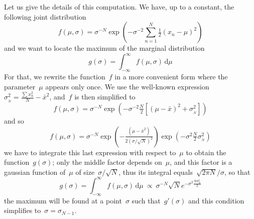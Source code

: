 Let us give the details of this computation.  We have, up to a constant, the
following joint distribution
$$
f(\mu,\sigma)=\sigma^{-N}\exp\left(
-\sigma^{-2}\sum_{n=1}^N\tfrac{1}{2}\left(x_n-\mu\right)^2
\right)
$$
and we want to locate the maximum of the marginal distribution
$$
g(\sigma)=\int_{-\infty}^\infty f(\mu,\sigma)\,\mathrm{d}\mu
$$
For that, we rewrite the function~$f$ in a more convenient form where the
parameter~$\mu$ appears only once.  We use the
well-known expression~$\sigma_{{}_N}^2=\frac{\sum x_n^2}{N}-\bar x^2$,
and~$f$ is then simplified to
$$
f(\mu,\sigma)=\sigma^{-N}\exp\left(
-\sigma^{-2}\tfrac{N}{2}\left[(\mu-\bar x)^2+\sigma_{{}_N}^2\right]
\right)
$$
and so
$$
f(\mu,\sigma)=\sigma^{-N}\exp\left(
-\tfrac{\left(\mu-\bar x^2\right)}{2\left(\sigma/\sqrt{N}\right)^2}
\right)
\exp\left(-\sigma^2\tfrac{N}{2}\sigma_{{}_N}^2
\right)
$$
we have to integrate this last expression with respect to~$\mu$ to obtain the
function~$g(\sigma)$; only the middle factor depends on~$\mu$, and this
factor is a gaussian function of~$\mu$ of size~$\sigma/\sqrt{N}$, thus its
integral equals~$\sqrt{2\pi N}/\sigma$, so that
$$
g(\sigma)
=
\int_{-\infty}^\infty f(\mu,\sigma)\,\mathrm{d}\mu
\ \propto\ %
\sigma^{-N}\sqrt{N}e^{-\sigma^2\frac{N\sigma_N^2}{2}}
$$
the maximum will be found at a point~$\sigma$ such that~$g'(\sigma)$
and this condition simplifies to~$\sigma=\sigma_{N-1}$.



